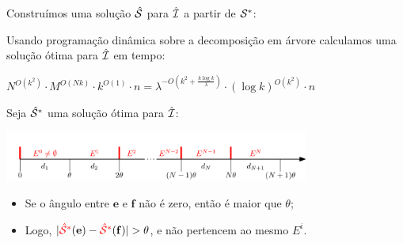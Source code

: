\begin{frame}{}
    \centering
    Construímos uma solução {\color{red} $\hat {\mathcal{S}}$} para $\hat {\mathcal{I}}$ a partir de {\color{blue} $\mathcal{S}^*$}:

    \begin{minipage}{\linewidth}
        \vspace*{2cm}
        \centering
    \end{minipage}
\end{frame}

\begin{frame}{}
    Usando programação dinâmica sobre a decomposição em árvore calculamos uma solução ótima para $\hat{\mathcal{I}}$ em tempo:

    \bigskip
    \centering
    $N^{O(k^2)}\cdot M^{O(Nk)}\cdot k^{O(1)} \cdot n = \lambda^{-O(k^2+\frac{k\log k}{\lambda})}\cdot (\log k)^{O(k^2)}\cdot n$
\end{frame}

\begin{frame}{}
    \centering
    Seja {\color{red} $\hat {\mathcal{S}}^*$} uma solução ótima para $\hat {\mathcal{I}}$:

    \begin{minipage}{\linewidth}
        \vspace*{2cm}
        \centering
        \includegraphics[width=10cm]{MSC/final/final_1.png}
    \end{minipage}
\end{frame}

\begin{frame}{}
    \centering
    \begin{itemize}[<+->]
        \item Se o ângulo entre $\mathbf{e}$ e $\mathbf{f}$ não é zero, então é maior que $\theta$;
        
        \item Logo, $|{\color{red} \hat \cals^*}(\mathbf{e})-{\color{red} \hat \cals^*}(\mathbf{f})|> \theta$, e não pertencem ao mesmo $E^i$.
    \end{itemize}
\end{frame}

